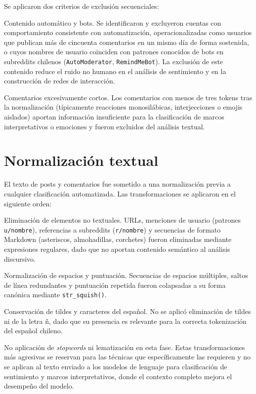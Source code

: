 \documentclass[
  letterpaper,
  numbers=noendperiod,
  fontsize=11pt,
  DIV=12,
  titlepage=false]{scrreprt}
\begin{document}
Se aplicaron dos criterios de exclusión secuenciales:

Contenido automático y bots. Se identificaron y excluyeron cuentas con
comportamiento consistente con automatización, operacionalizadas como
usuarios que publican más de cincuenta comentarios en un mismo día de
forma sostenida, o cuyos nombres de usuario coinciden con patrones
conocidos de bots en subreddits chilenos (\texttt{AutoModerator},
\texttt{RemindMeBot}). La exclusión de este contenido reduce el ruido no
humano en el análisis de sentimiento y en la construcción de redes de
interacción.

Comentarios excesivamente cortos. Los comentarios con menos de tres
tokens tras la normalización (típicamente reacciones monosilábicas,
interjecciones o emojis aislados) aportan información insuficiente para
la clasificación de marcos interpretativos o emociones y fueron
excluidos del análisis textual.

\section{Normalización textual}\label{normalizaciuxf3n-textual}

El texto de posts y comentarios fue sometido a una normalización previa
a cualquier clasificación automatizada. Las transformaciones se
aplicaron en el siguiente orden:

Eliminación de elementos no textuales. URLs, menciones de usuario
(patrones \texttt{u/nombre}), referencias a subreddits
(\texttt{r/nombre}) y secuencias de formato Markdown (asteriscos,
almohadillas, corchetes) fueron eliminadas mediante expresiones
regulares, dado que no aportan contenido semántico al análisis
discursivo.

Normalización de espacios y puntuación. Secuencias de espacios
múltiples, saltos de línea redundantes y puntuación repetida fueron
colapsadas a su forma canónica mediante \texttt{str\_squish()}.

Conservación de tildes y caracteres del español. No se aplicó
eliminación de tildes ni de la letra ñ, dado que su presencia es
relevante para la correcta tokenización del español chileno.

No aplicación de \emph{stopwords} ni lematización en esta fase. Estas
transformaciones más agresivas se reservan para las técnicas que
específicamente las requieren y no se aplican al texto enviado a los
modelos de lenguaje para clasificación de sentimiento y marcos
interpretativos, donde el contexto completo mejora el desempeño del
modelo.
\end{document}
